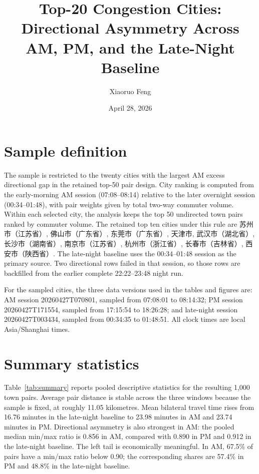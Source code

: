 \documentclass[12pt]{article}
\title{Top-20 Congestion Cities: Directional Asymmetry Across AM, PM, and the Late-Night Baseline}
\author{Xiaoruo Feng}
\date{April 28, 2026}
\begin{document}
\maketitle

\section*{Sample definition}

The sample is restricted to the twenty cities with the largest AM excess directional gap in the retained top-50 pair design. City ranking is computed from the early-morning AM session (07:08--08:14) relative to the later overnight session (00:34--01:48), with pair weights given by total two-way commuter volume. Within each selected city, the analysis keeps the top 50 undirected town pairs ranked by commuter volume. The retained top ten cities under this rule are 苏州市（江苏省）, 佛山市（广东省）, 东莞市（广东省）, 天津市, 武汉市（湖北省）, 长沙市（湖南省）, 南京市（江苏省）, 杭州市（浙江省）, 长春市（吉林省）, 西安市（陕西省）. The late-night baseline uses the 00:34--01:48 session as the primary source. Two directional rows failed in that session, so those rows are backfilled from the earlier complete 22:22--23:48 night run.

For the sampled cities, the three data versions used in the tables and figures are: AM session 20260427T070801, sampled from 07:08:01 to 08:14:32; PM session 20260427T171554, sampled from 17:15:54 to 18:26:28; and late-night session 20260427T003434, sampled from 00:34:35 to 01:48:51. All clock times are local Asia/Shanghai times.

\section*{Summary statistics}

Table~\ref{tab:summary} reports pooled descriptive statistics for the resulting 1,000 town pairs. Average pair distance is stable across the three windows because the sample is fixed, at roughly 11.05 kilometres. Mean bilateral travel time rises from 16.76 minutes in the late-night baseline to 23.98 minutes in AM and 23.74 minutes in PM. Directional asymmetry is also strongest in AM: the pooled median min/max ratio is 0.856 in AM, compared with 0.890 in PM and 0.912 in the late-night baseline. The left tail is economically meaningful. In AM, 67.5\% of pairs have a min/max ratio below 0.90; the corresponding shares are 57.4\% in PM and 48.8\% in the late-night baseline.
\end{document}
